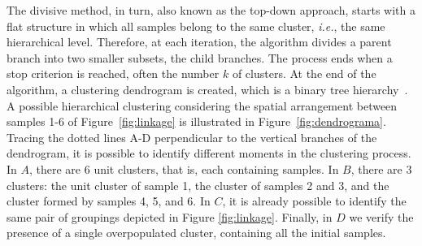 \documentclass{ieeeaccess}
\begin{document}
The divisive method, in turn, also known as the top-down approach, starts with a flat structure in which all samples belong to the same cluster, \textit{i.e.}, the same hierarchical level. Therefore, at each iteration, the algorithm divides a parent branch into two smaller subsets, the child branches. The process ends when a stop criterion is reached, often the number $ k $ of clusters. At the end of the algorithm, a clustering dendrogram is created, which is a binary tree hierarchy~\cite {benavent2019fca, icnc-2020-nicollas, fahad2014survey, govender2020application}. A possible hierarchical clustering considering the spatial arrangement between samples 1-6 of Figure~\ref{fig:linkage} is illustrated in Figure~\ref{fig:dendrograma}. Tracing the dotted lines A-D perpendicular to the vertical branches of the dendrogram, it is possible to identify different moments in the clustering process. In $ A $, there are 6 unit clusters, that is, each containing samples. In $ B $, there are 3 clusters: the unit cluster of sample 1, the cluster of samples 2 and 3, and the cluster formed by samples 4, 5, and 6. In $ C $, it is already possible to identify the same pair of groupings depicted in Figure \ref{fig:linkage}. Finally, in $ D $ we verify the presence of a single overpopulated cluster, containing all the initial samples.


\end{document}
